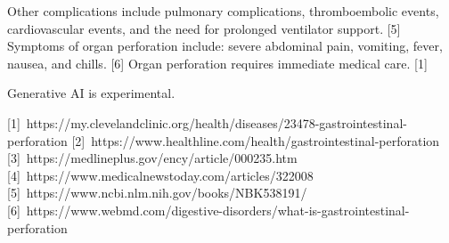 Other complications include pulmonary complications, thromboembolic events, cardiovascular events, and the need for prolonged ventilator support. [5]  
Symptoms of organ perforation include: severe abdominal pain, vomiting, fever, nausea, and chills. [6]  
Organ perforation requires immediate medical care. [1]  

Generative AI is experimental.

[1] https://my.clevelandclinic.org/health/diseases/23478-gastrointestinal-perforation
[2] https://www.healthline.com/health/gastrointestinal-perforation
[3] https://medlineplus.gov/ency/article/000235.htm
[4] https://www.medicalnewstoday.com/articles/322008
[5] https://www.ncbi.nlm.nih.gov/books/NBK538191/
[6] https://www.webmd.com/digestive-disorders/what-is-gastrointestinal-perforation



